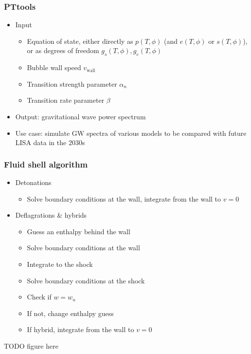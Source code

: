 \begin{frame}
    \frametitle{PTtools}
    \begin{itemize}
        \item Input
        \begin{itemize}
            \item Equation of state, either directly as $p(T,\phi)$ (and $e(T,\phi)$ or $s(T,\phi)$),
                or as degrees of freedom $g_s(T,\phi), g_e(T,\phi)$
            \item Bubble wall speed $v_\text{wall}$
            \item Transition strength parameter $\alpha_n$
            \item Transition rate parameter $\beta$
        \end{itemize}
        \item Output: gravitational wave power spectrum
        \item Use case: simulate GW spectra of various models to be compared with future LISA data in the 2030s
    \end{itemize}
\end{frame}

\begin{frame}
    \frametitle{Fluid shell algorithm}
    \begin{minipage}[t]{0.48\linewidth}%
        \begin{itemize}
            \item Detonations
            \begin{itemize}
                \item Solve boundary conditions at the wall, integrate from the wall to $v=0$
            \end{itemize}
            \item Deflagrations \& hybrids
            \begin{itemize}
                \item Guess an enthalpy behind the wall
                \item Solve boundary conditions at the wall
                \item Integrate to the shock
                \item Solve boundary conditions at the shock
                \item Check if $w=w_n$
                \item If not, change enthalpy guess
                \item If hybrid, integrate from the wall to $v=0$
            \end{itemize}%
        \end{itemize}%
    \end{minipage}%
    \hfill%
    \begin{minipage}[t]{0.48\linewidth}%
        TODO figure here
    \end{minipage}
\end{frame}

